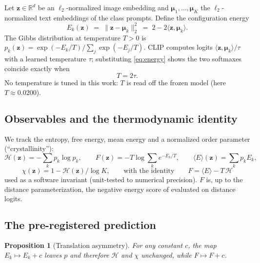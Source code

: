 \documentclass[11pt]{article}
\newtheorem{proposition}{Proposition}
\newcommand{\bz}{\mathbf{z}}
\newcommand{\bmu}{\boldsymbol{\mu}}
\newcommand{\Hent}{\mathcal{H}}
\begin{document}
Let $\bz\in\mathbb{R}^d$ be an $\ell_2$-normalized image embedding and
$\bmu_1,\dots,\bmu_K$ the $\ell_2$-normalized text embeddings of the class
prompts. Define the configuration energy
\begin{equation}
E_k(\bz) \;=\; \lVert \bz - \bmu_k \rVert_2^2 \;=\; 2 - 2\langle \bz, \bmu_k\rangle .
\label{eq:energy}
\end{equation}
The Gibbs distribution at temperature $T>0$ is
$p_k(\bz) = \exp(-E_k/T)\big/\sum_j \exp(-E_j/T)$.
CLIP computes logits $\langle\bz,\bmu_k\rangle/\tau$ with a learned temperature
$\tau$; substituting \eqref{eq:energy} shows the two softmaxes coincide exactly
when
\begin{equation}
T = 2\tau .
\label{eq:temp}
\end{equation}
No temperature is tuned in this work: $T$ is read off the frozen model
(here $T\approx 0.0200$).

\subsection{Observables and the thermodynamic identity}

We track the entropy, free energy, mean energy and a normalized order
parameter (``crystallinity''):
\begin{equation}
\Hent(\bz) = -\sum_k p_k \log p_k,\qquad
F(\bz) = -T\log\!\sum_k e^{-E_k/T},\qquad
\langle E\rangle(\bz) = \sum_k p_k E_k,
\end{equation}
\begin{equation}
\chi(\bz) = 1 - \Hent(\bz)/\log K, \qquad\text{with the identity}\qquad
F = \langle E\rangle - T\,\Hent
\label{eq:identity}
\end{equation}
used as a software invariant (unit-tested to numerical precision). $F$ is,
up to the distance parameterization, the negative energy score of
\citet{liu2020energy} evaluated on distance logits.

\subsection{The pre-registered prediction}
\label{sec:prediction}

\begin{proposition}[Translation asymmetry]
For any constant $c$, the map $E_k \mapsto E_k + c$ leaves $p$ and therefore
$\Hent$ and $\chi$ unchanged, while $F \mapsto F + c$.
\end{proposition}
\end{document}

